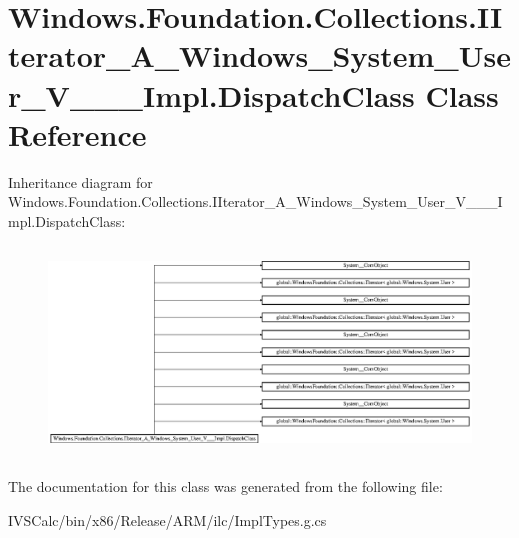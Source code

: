 \hypertarget{class_windows_1_1_foundation_1_1_collections_1_1_i_iterator___a___windows___system___user___v_______impl_1_1_dispatch_class}{}\section{Windows.\+Foundation.\+Collections.\+I\+Iterator\+\_\+\+A\+\_\+\+Windows\+\_\+\+System\+\_\+\+User\+\_\+\+V\+\_\+\+\_\+\+\_\+\+Impl.\+Dispatch\+Class Class Reference}
\label{class_windows_1_1_foundation_1_1_collections_1_1_i_iterator___a___windows___system___user___v_______impl_1_1_dispatch_class}
Inheritance diagram for Windows.\+Foundation.\+Collections.\+I\+Iterator\+\_\+\+A\+\_\+\+Windows\+\_\+\+System\+\_\+\+User\+\_\+\+V\+\_\+\+\_\+\+\_\+\+Impl.\+Dispatch\+Class\+:\begin{figure}[H]
\begin{center}
\leavevmode
\includegraphics[height=5.641026cm]{class_windows_1_1_foundation_1_1_collections_1_1_i_iterator___a___windows___system___user___v_______impl_1_1_dispatch_class}
\end{center}
\end{figure}


The documentation for this class was generated from the following file\+:\begin{DoxyCompactItemize}
\item 
I\+V\+S\+Calc/bin/x86/\+Release/\+A\+R\+M/ilc/Impl\+Types.\+g.\+cs\end{DoxyCompactItemize}
